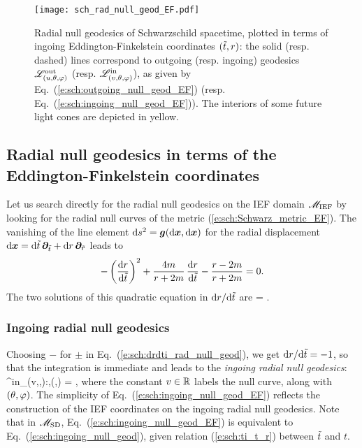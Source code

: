 \begin{figure}
\centerline{\texttt{[image: sch\_rad\_null\_geod\_EF.pdf]}}
\caption[]{\label{f:sch:rad_null_geod_EF} \footnotesize
Radial null geodesics of Schwarzschild spacetime, plotted in terms
of ingoing Eddington-Finkelstein coordinates $({\tilde t},r)$: the solid (resp. dashed) lines
correspond to outgoing (resp. ingoing) geodesics $\mathscr{L}^{\rm out}_{(u,\theta,\varphi)}$
(resp. $\mathscr{L}^{\rm in}_{(v,\theta,\varphi)}$), as given by Eq.~(\ref{e:sch:outgoing_null_geod_EF})
(resp. Eq.~(\ref{e:sch:ingoing_null_geod_EF})). The interiors of some future light
cones are depicted in yellow.}
\end{figure}

\subsection{Radial null geodesics in terms of the Eddington-Finkelstein coordinates}
\label{s:sch:radial_null_IEF}

Let us search directly for the radial null geodesics on the IEF domain $\mathscr{M}_{\rm IEF}$
by looking for the radial null curves of the metric (\ref{e:sch:Schwarz_metric_EF}).
The vanishing of the line element $\mathrm{d} s^2 = \bm{g}(\mathrm{d}\bm{x},\mathrm{d}\bm{x})$ for the
radial displacement $\mathrm{d}\bm{x} = \mathrm{d}{\tilde t} \, \bm{\partial}_{{\tilde t}} +  \mathrm{d} r \, \bm{\partial}_{\tilde{r}}$
leads to
\[
    - \left( \frac{\mathrm{d} r}{\mathrm{d} {\tilde t}} \right)^2 + \frac{4 m}{r + 2 m}\,  \frac{\mathrm{d} r}{\mathrm{d} {\tilde t}}
    - \frac{r - 2m}{r + 2m} = 0 .
\]
The two solutions of this quadratic equation in $\mathrm{d} r / \mathrm{d}{\tilde t}$ are
\be \label{e:sch:drdti_rad_null_geod}
     =  .
\ee

\subsubsection{Ingoing radial null geodesics}

Choosing $-$ for $\pm$ in Eq.~(\ref{e:sch:drdti_rad_null_geod}),
we get $\mathrm{d} r / \mathrm{d} {\tilde t} = -1$, so that the integration is
immediate and leads to the \emph{ingoing radial null geodesics}:
\be \label{e:sch:ingoing_null_geod_EF}
    \Li^{\rm in}_{(v,\th,\ph)}:\quad {},\quad (\th,\ph) = ,
\ee
where the constant $v\in \mathbb{R}$ labels the null curve, along with $(\theta,\varphi)$.
The simplicity of Eq.~(\ref{e:sch:ingoing_null_geod_EF})
reflects the construction of the IEF coordinates on the ingoing radial null geodesics.
Note that in
$\mathscr{M}_{\rm SD}$, Eq.~(\ref{e:sch:ingoing_null_geod_EF}) is equivalent to Eq.~(\ref{e:sch:ingoing_null_geod}),
given relation (\ref{e:sch:ti_t_r}) between ${\tilde t}$ and $t$.

